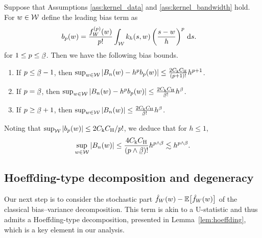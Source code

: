 \begin{theorem}
  \label{thm:kernel_bias}

  Suppose that Assumptions \ref{ass:kernel_data} and \ref{ass:kernel_bandwidth}
  hold. For $w \in \mathcal{W}$ define the leading bias term as
  \begin{align*}
    b_p(w)
    &=
    \frac{f_W^{(p)}(w)}{p!}
    \int_{\mathcal{W}}
    k_h(s,w)
    \left(
      \frac{s-w}{h}
    \right)^p
    \,\mathrm{d}s.
  \end{align*}
  for $1 \leq p \leq \flbeta$. Then we have the following bias bounds.
  \begin{enumerate}[label=(\roman*)]
    \item If $p \leq \flbeta - 1$, then
      $\sup_{w \in \mathcal{W}} | B_n(w) - h^p b_p(w) |
      \leq \frac{2 C_{\mathrm{k}} C_{\mathrm{H}}}{(p+1)!} h^{p+1}$.

    \item If $p = \flbeta$, then
      $\sup_{w \in \cW} | B_n(w) - h^p b_p(w) |
      \leq \frac{2 C_\rk C_\rH}{\flbeta !} h^\beta$.

    \item If $p \geq \flbeta+1$, then
      $\sup_{w \in \cW} | B_n(w) |
      \leq \frac{2 C_\rk C_\rH}{\flbeta !} h^\beta$.
  \end{enumerate}
  Noting that $\sup_{\mathcal{W}} |b_p(w)| \leq 2 C_{\mathrm{k}} C_{\mathrm{H}} / p!$,
  we deduce that for $h \leq 1$,
  \begin{align*}
    \sup_{w \in \cW} | B_n(w) |
    \leq
    \frac{4 C_\rk C_\rH}{(p \wedge \flbeta)!}
    h^{p \wedge \beta}
    \lesssim
    h^{p \wedge \beta}.
  \end{align*}

\end{theorem}

\subsection{Hoeffding-type decomposition and degeneracy}
\label{sec:degeneracy}

Our next step is to consider the stochastic part
$\hat f_W(w) - \mathbb{E} \big[ \hat f_W(w) \big]$
of the classical bias--variance decomposition. This term is akin to a
U-statistic and thus admits a Hoeffding-type decomposition, presented in
Lemma~\ref{lem:hoeffding}, which is a key element in our analysis.


